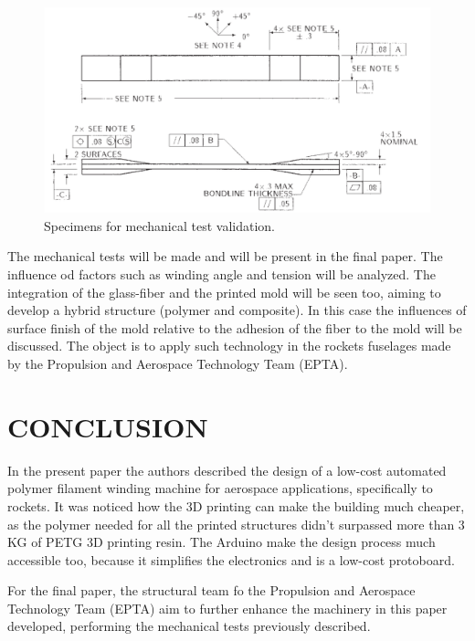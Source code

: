 \documentclass[10pt,fleqn,a4paper,twoside]{article}
\begin{document}
\begin{figure}[!h]
	\centering
	\includegraphics[angle=0, trim = {0mm 0mm 0mm 0mm}, clip , scale=0.5]{imagens/specimens}
	\caption{Specimens for mechanical test validation.}
	\label{i7}
\end{figure}

The mechanical tests will be made and will be present in the final paper. The influence od factors such as winding angle and tension 
will be analyzed. The integration of the glass-fiber and the printed mold will be seen too, aiming to develop a hybrid structure (polymer and composite). In this case the influences of surface finish of the mold relative to the adhesion of the fiber to the mold will be discussed. The object is to apply such technology in the rockets fuselages made by the Propulsion and Aerospace Technology Team (EPTA).  

\section{CONCLUSION}

In the present paper the authors described the design of a low-cost automated polymer filament winding machine for aerospace applications, specifically to rockets. It was noticed how the 3D printing can make the building much cheaper, as the polymer needed for all the printed structures didn't surpassed more than 3 KG of PETG 3D printing resin. The Arduino make the design process much accessible too, because it simplifies the electronics and is a low-cost protoboard.   

For the final paper, the structural team fo the Propulsion and Aerospace Technology Team (EPTA) aim to further enhance the machinery in this paper developed, performing the mechanical tests previously described.  
\end{document}
